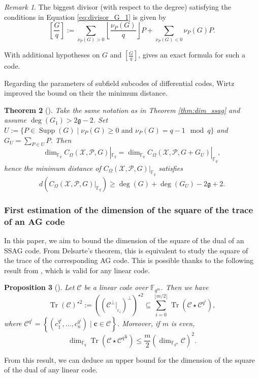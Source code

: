 \documentclass[lettersize,journal]{IEEEtran}
\theoremstyle{plain}
\newtheorem{thm}{Theorem}[section]
\newtheorem{proposition}[thm]{Proposition}
\theoremstyle{definition}
\theoremstyle{remark}
\newtheorem{remark}[thm]{Remark}
\DeclareMathOperator{\trace}{Tr}
\newcommand{\calP}{\mathcal{P}}
\newcommand{\calC}{\mathcal{C}}
\newcommand{\calX}{\mathcal{X}}
\newcommand{\fqm}{\mathbb{F}_{q^m}}
\newcommand{\fq}{\mathbb{F}_{q}}
\newcommand{\Tr}[1]{\trace\!\left(#1\right)}
\newcommand{\set}[1]{\left\{#1\right\}}
\newcommand{\Supp}{\operatorname{Supp}}
\begin{document}
	\begin{remark}\label{rk:G/q}
		The biggest divisor (with respect to the degree) satisfying the conditions in Equation \eqref{eq:divisor_G_1} is given by 
		\begin{equation}\label{eq:G/q}
			\left[ \frac{G}{q} \right]:= \sum\limits_{\nu_P(G)>0} \left\lfloor\frac{\nu_P(G)}{q}\right\rfloor P + \sum\limits_{\nu_P(G)<0}\nu_P(G)P.
		\end{equation}
	\end{remark}
	
	With additional hypotheses on $G$ and $\displaystyle \left[ \frac{G}{q} \right]$, {\cite[Theorem~1]{Le16}} gives an exact formula for such a code.
	
	Regarding the parameters of subfield subcodes of differential codes, Wirtz \cite{W88} improved the bound on their the minimum distance.
	
	\begin{thm}[{\cite[Theorem~2]{W88}}]\label{thm:Wirtz}
		Take the same notation as in Theorem \ref{thm:dim_ssag} and assume $\deg (G_1) > 2 \mathfrak{g}-2$.
		Set $U:=\{P \in \Supp(G) \mid \nu_P(G) \geq 0 \text{ and } \nu_P(G) = q-1 \mod q\}$ and $G_U=\sum_{P \in U} P$. Then
		\[	\dim_{\fq} C_{\Omega}(\calX,\calP,G)|_{\fq} = 	\dim_{\fq} C_{\Omega}(\calX,\calP,G+G_U)|_{\fq}, \]
		hence the minimum distance of $C_{\Omega}(\calX,\calP,G)|_{\fq}$ satisfies
		\[d\left(C_{\Omega}(\calX,\calP,G)|_{\fq} \right) \geq \deg (G) + \deg (G_U) -2\mathfrak{g}+2.\]
	\end{thm}
	
	
	\subsubsection{First estimation of the dimension of the square of the trace of an AG code}
	
	In this paper, we aim to bound the dimension of the square of the dual of an SSAG code. From Delsarte's theorem, this is equivalent to study the square of the trace of the corresponding AG code. 
	This is possible thanks to the following result from \cite{MT21}, which is valid for any linear code.
	
	\begin{proposition}[{\cite[Proposition~15]{MT21}}] \label{prop:Tr_BoundSchurSquare}
		Let $\calC$ be a linear code over $\fqm$. Then we have 
		\begin{equation} \label{eq:key_equation} \Tr{\calC}^{\star2} := ((\calC^{\perp}|_{_{{\mathbb{F}_q}}})^{\perp})^{\star2} \subseteq \sum\limits_{i=0}^{\lfloor{m/2} \rfloor} \Tr{\calC\star \calC^{q^i}},
		\end{equation}
		where $\calC^{q^i}=\set{\left(c_1^{q^i},\dots,c_n^{q^i}\right) \mid \mathbf{c} \in \calC}$.
		Moreover, if $m$ is even, 
		\begin{equation} \label{eq:dim_m/2} \dim_{\fq} \Tr{\calC\star \calC^{q^{\frac{m}{2}}}} \leq \frac{m}{2} (\dim_{\fqm}\calC)^2.
		\end{equation}
	\end{proposition}
	From this result, we can deduce an upper bound for the dimension of the square of the dual of any linear code.
	
\end{document}
